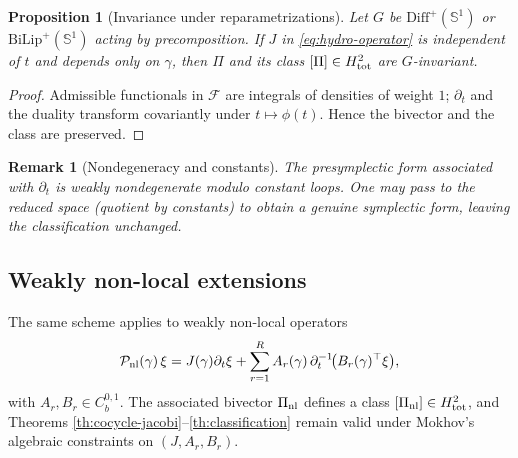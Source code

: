 \documentclass{amsart}
\newcounter{thm}
\newcounter{ex}
\newcounter{re}
\newtheorem{proposition}[thm]{Proposition}
\newtheorem{remark}[thm]{Remark}
\begin{document}
\begin{proposition}[Invariance under reparametrizations]
Let $G$ be $\mathrm{Diff}^+(\mathbb S^1)$ or $\mathrm{BiLip}^+(\mathbb S^1)$ acting by
precomposition. If $J$ in \eqref{eq:hydro-operator} is independent of $t$ and depends only on $\gamma$,
then $\Pi$ and its class $[\Pi]\in H^2_{\rm tot}$ are $G$-invariant.
\end{proposition}

\begin{proof}
Admissible functionals in $\mathcal F$ are integrals of densities of weight $1$;
$\partial_t$ and the duality transform covariantly under $t\mapsto\phi(t)$.
Hence the bivector and the class are preserved.
\end{proof}

\begin{remark}[Nondegeneracy and constants]
The presymplectic form associated with $\partial_t$ is weakly nondegenerate modulo
constant loops. One may pass to the reduced space (quotient by constants) to obtain a genuine
symplectic form, leaving the classification unchanged.
\end{remark}

\subsection{Weakly non-local extensions}

The same scheme applies to weakly non-local operators
\[
\mathcal P_{\rm nl}(\gamma)\,\xi
= J(\gamma)\partial_t\xi+\sum_{r=1}^R A_r(\gamma)\,\partial_t^{-1}\!\big(B_r(\gamma)^\top\xi\big),
\]
with $A_r,B_r\in C^{0,1}_b$. The associated bivector $\Pi_{\rm nl}$ defines a class
$[\Pi_{\rm nl}]\in H^2_{\rm tot}$, and Theorems \ref{th:cocycle-jacobi}--\ref{th:classification}
remain valid under Mokhov's algebraic constraints on $(J,A_r,B_r)$.
\end{document}
